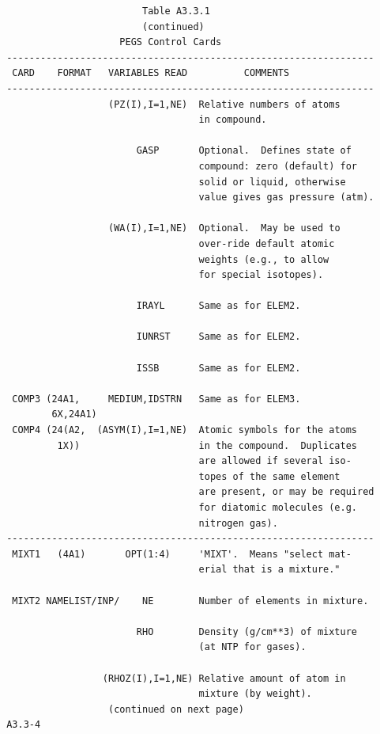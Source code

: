 \newpage {} \begin{verbatim}
                         Table A3.3.1
                         (continued)
                     PEGS Control Cards
 -----------------------------------------------------------------
  CARD    FORMAT   VARIABLES READ          COMMENTS
 -----------------------------------------------------------------
                   (PZ(I),I=1,NE)  Relative numbers of atoms
                                   in compound.

                        GASP       Optional.  Defines state of
                                   compound: zero (default) for
                                   solid or liquid, otherwise
                                   value gives gas pressure (atm).

                   (WA(I),I=1,NE)  Optional.  May be used to
                                   over-ride default atomic
                                   weights (e.g., to allow
                                   for special isotopes).

                        IRAYL      Same as for ELEM2.

                        IUNRST     Same as for ELEM2.

                        ISSB       Same as for ELEM2.

  COMP3 (24A1,     MEDIUM,IDSTRN   Same as for ELEM3.
         6X,24A1)
  COMP4 (24(A2,  (ASYM(I),I=1,NE)  Atomic symbols for the atoms
          1X))                     in the compound.  Duplicates
                                   are allowed if several iso-
                                   topes of the same element
                                   are present, or may be required
                                   for diatomic molecules (e.g.
                                   nitrogen gas).
 -----------------------------------------------------------------
  MIXT1   (4A1)       OPT(1:4)     'MIXT'.  Means "select mat-
                                   erial that is a mixture."

  MIXT2 NAMELIST/INP/    NE        Number of elements in mixture.

                        RHO        Density (g/cm**3) of mixture
                                   (at NTP for gases).

                  (RHOZ(I),I=1,NE) Relative amount of atom in
                                   mixture (by weight).
                   (continued on next page)
 A3.3-4
\end{verbatim}
